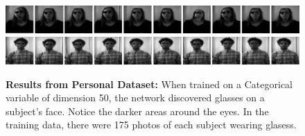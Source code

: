 \documentclass[conference,11pt]{IEEEtran}
\begin{document}
\begin{figure}
    \centering
    \includegraphics[width=7.25in]{pictures/personal/lilly-glasses-final.jpg}\vspace*{2mm}
    \hspace*{.15mm}\includegraphics[width=7.25in]{pictures/personal/rasheed-glasses-final.jpg}
    \caption{\textbf{Results from Personal Dataset:} When trained on a Categorical variable of dimension 50, the network discovered glasses on a subject's face.  Notice the darker areas around the eyes.  In the training data, there were 175 photos of each subject wearing glasess.}  
\end{figure}
\end{document}
